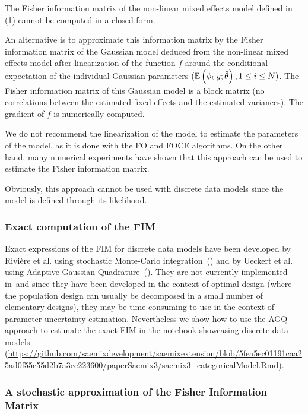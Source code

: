 The Fisher information matrix of the non-linear mixed effects model defined in (1) cannot be computed in a closed-form.

An alternative is to approximate this information matrix  by the Fisher information matrix of the Gaussian model deduced from the non-linear mixed effects model after linearization of the function $f$ around the conditional expectation of the individual Gaussian parameters $(\mathbb{E}\left(\phi_{i}|y;\hat{\theta}\right), 1\leq
i \leq N) $. The Fisher information matrix of this Gaussian model is a block matrix (no correlations between the estimated fixed effects and the estimated variances). The gradient of $f$ is numerically computed.

 We do not recommend the linearization of the model to estimate the parameters of the model, as it is done with the FO and FOCE algorithms. On the other hand, many numerical experiments have shown that this approach can be used to estimate the Fisher information matrix.

 Obviously, this approach cannot be used with discrete data models since the model is defined through its likelihood. 

\subsubsection{Exact computation of the FIM}

Exact expressions of the FIM for discrete data models have been developed by Rivière et al. using stochastic Monte-Carlo integration~(\cite{Riviere16}) and by Ueckert et al. using Adaptive Gaussian Quadrature~(\cite{Ueckert16}). They are not currently implemented in~\monolix and since they have been developed in the context of optimal design (where the population design can usually be decomposed in a small number of elementary designs), they may be time consuming to use in the context of parameter uncertainty estimation. Nevertheless we show how to use the AGQ approach to estimate the exact FIM in the notebook showcasing discrete data models (\url{https://github.com/saemixdevelopment/saemixextension/blob/5fea5ec01191caa25ad0f55c55d2b7a3ec223600/paperSaemix3/saemix3_categoricalModel.Rmd}).

\subsubsection{A stochastic approximation of the Fisher Information Matrix}

